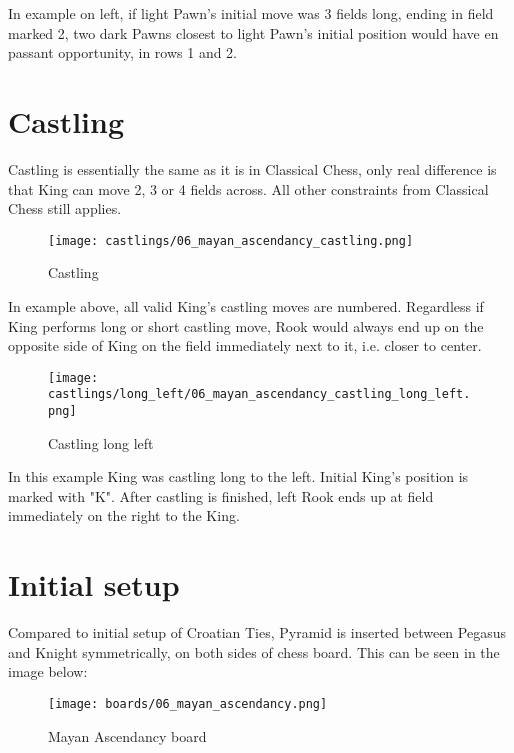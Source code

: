 In example on left, if light Pawn's initial move was 3 fields long, ending in field marked
2, two dark Pawns closest to light Pawn's initial position would have en passant opportunity,
in rows 1 and 2.

\clearpage %

\section*{Castling}

Castling is essentially the same as it is in Classical Chess, only real difference is that
King can move 2, 3 or 4 fields across. All other constraints from Classical Chess still
applies.

\noindent
\begin{figure}[!h]
\texttt{[image: castlings/06\_mayan\_ascendancy\_castling.png]}
\caption{Castling}
\label{fig:ma_castling}
\end{figure}

In example above, all valid King's castling moves are numbered. Regardless if King performs
long or short castling move, Rook would always end up on the opposite side of King on the
field immediately next to it, i.e. closer to center.

\noindent
\begin{figure}[!h]
\texttt{[image: castlings/long\_left/06\_mayan\_ascendancy\_castling\_long\_left.png]}
\caption{Castling long left}
\label{fig:ma_castling_long_left}
\end{figure}

In this example King was castling long to the left. Initial King's position is marked with "K".
After castling is finished, left Rook ends up at field immediately on the right to the King.

\clearpage %

\section*{Initial setup}

Compared to initial setup of Croatian Ties, Pyramid is inserted between Pegasus and Knight
symmetrically, on both sides of chess board. This can be seen in the image below:

\noindent
\begin{figure}[h]
\texttt{[image: boards/06\_mayan\_ascendancy.png]}
\caption{Mayan Ascendancy board}
\label{fig:mayan_ascendancy}
\end{figure}

\clearpage %
